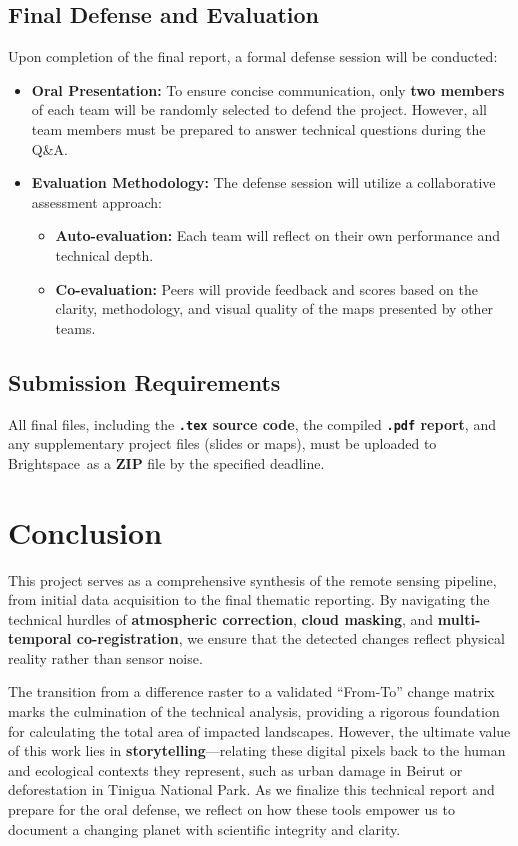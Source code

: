 \documentclass{article}
\begin{document}
\subsection*{Final Defense and Evaluation}

Upon completion of the final report, a formal defense session will be conducted:

\begin{itemize}
    \item \textbf{Oral Presentation:} To ensure concise communication, only \textbf{two members} of each team will be randomly selected to defend the project. However, all team members must be prepared to answer technical questions during the Q\&A.
    \item \textbf{Evaluation Methodology:} The defense session will utilize a collaborative assessment approach:
    \begin{itemize}
        \item \textbf{Auto-evaluation:} Each team will reflect on their own performance and technical depth.
        \item \textbf{Co-evaluation:} Peers will provide feedback and scores based on the clarity, methodology, and visual quality of the maps presented by other teams.
    \end{itemize}
\end{itemize}

\subsection*{Submission Requirements}
All final files, including the \textbf{\texttt{.tex} source code}, the compiled \textbf{\texttt{.pdf} report}, and any supplementary project files (slides or maps), must be uploaded to Brightspace\texttrademark\ as a \textbf{ZIP} file by the specified deadline.

\section{Conclusion}
This project serves as a comprehensive synthesis of the remote sensing pipeline, from initial data acquisition to the final thematic reporting. By navigating the technical hurdles of \textbf{atmospheric correction}, \textbf{cloud masking}, and \textbf{multi-temporal co-registration}, we ensure that the detected changes reflect physical reality rather than sensor noise.

The transition from a difference raster to a validated ``From-To'' change matrix marks the culmination of the technical analysis, providing a rigorous foundation for calculating the total area of impacted landscapes. However, the ultimate value of this work lies in \textbf{storytelling}—relating these digital pixels back to the human and ecological contexts they represent, such as urban damage in Beirut or deforestation in Tinigua National Park. As we finalize this technical report and prepare for the oral defense, we reflect on how these tools empower us to document a changing planet with scientific integrity and clarity.
\end{document}

